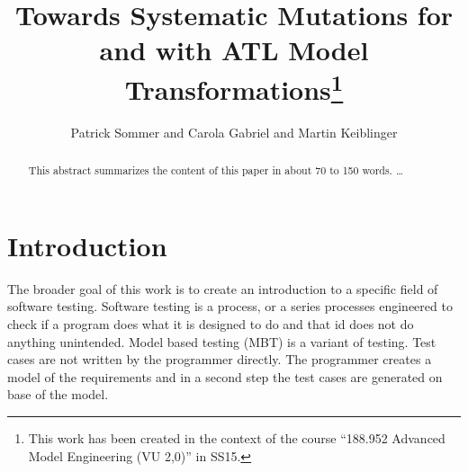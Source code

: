 \documentclass{llncs}
\begin{document}
\pagestyle{plain}

\title{Towards Systematic Mutations for and with ATL Model Transformations\footnote{This work has been created in the context of the course ``188.952 Advanced Model Engineering (VU 2,0)'' in SS15.}}


\author{Patrick Sommer and Carola Gabriel and Martin Keiblinger}


\maketitle

\begin{abstract}

This abstract summarizes the content of this paper in about 70 to 150 words. \dots
\end{abstract}

\tableofcontents
\newpage


\section{Introduction}

The broader goal of this work is to create an introduction to a specific field of software testing. Software testing is a process, or a series processes engineered to check if a program does what it is designed to do and that id does not do anything unintended.\cite{Myers:2004} Model based testing (MBT) is a variant of testing. Test cases are not written by the programmer directly. The programmer creates a model of the requirements and in a second step the test cases are generated on base of the model.\cite{Utting:2012}
\end{document}
